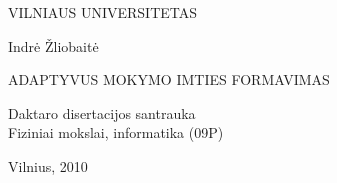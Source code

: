 
\thispagestyle{empty}                   %
\lithuanian

\begin{center}
	\vspace*{5mm}	
	
	VILNIAUS UNIVERSITETAS \\

	
	
	\vspace{45mm}
	
	Indrė Žliobaitė
	
	\vspace{15mm}
	
  ADAPTYVUS MOKYMO IMTIES FORMAVIMAS

  \vspace{30mm}
  
  Daktaro disertacijos santrauka\\[-6pt]  
  Fiziniai mokslai, informatika (09P)
  
  \vspace{60mm}
  
  Vilnius, 2010
  
\end{center}

\newpage
\thispagestyle{empty}                   %
\lithuanian

